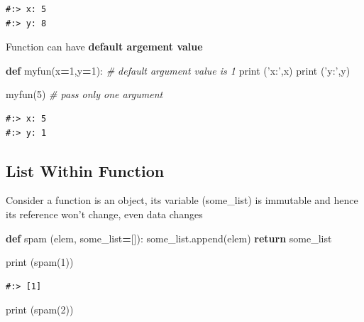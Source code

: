 \documentclass[
]{book}
\newenvironment{Shaded}{\begin{snugshade}}{\end{snugshade}}
\newcommand{\BuiltInTok}[1]{#1}
\newcommand{\CommentTok}[1]{\textcolor[rgb]{0.37,0.37,0.37}{\textit{#1}}}
\newcommand{\ControlFlowTok}[1]{\textcolor[rgb]{0.27,0.27,0.27}{\textbf{#1}}}
\newcommand{\DecValTok}[1]{\textcolor[rgb]{0.06,0.06,0.06}{#1}}
\newcommand{\KeywordTok}[1]{\textcolor[rgb]{0.27,0.27,0.27}{\textbf{#1}}}
\newcommand{\NormalTok}[1]{#1}
\newcommand{\OperatorTok}[1]{\textcolor[rgb]{0.43,0.43,0.43}{\textbf{#1}}}
\newcommand{\StringTok}[1]{\textcolor[rgb]{0.5,0.5,0.5}{#1}}
\begin{document}
\begin{verbatim}
#:> x: 5
#:> y: 8
\end{verbatim}

Function can have \textbf{default argement value}

\begin{Shaded}
\begin{Highlighting}[]
\KeywordTok{def}\NormalTok{ myfun(x}\OperatorTok{=}\DecValTok{1}\NormalTok{,y}\OperatorTok{=}\DecValTok{1}\NormalTok{):  }\CommentTok{# default argument value is 1}
    \BuiltInTok{print}\NormalTok{ (}\StringTok{'x:'}\NormalTok{,x)}
    \BuiltInTok{print}\NormalTok{ (}\StringTok{'y:'}\NormalTok{,y)}
    
\NormalTok{myfun(}\DecValTok{5}\NormalTok{)  }\CommentTok{# pass only one argument}
\end{Highlighting}
\end{Shaded}

\begin{verbatim}
#:> x: 5
#:> y: 1
\end{verbatim}

\hypertarget{list-within-function}{%
\subsection{List Within Function}\label{list-within-function}}

Consider a function is an object, its variable (some\_list) is immutable and hence its reference won't change, even data changes

\begin{Shaded}
\begin{Highlighting}[]
\KeywordTok{def}\NormalTok{ spam (elem, some_list}\OperatorTok{=}\NormalTok{[]):}
\NormalTok{    some_list.append(elem)}
    \ControlFlowTok{return}\NormalTok{ some_list}

\BuiltInTok{print}\NormalTok{ (spam(}\DecValTok{1}\NormalTok{))}
\end{Highlighting}
\end{Shaded}

\begin{verbatim}
#:> [1]
\end{verbatim}

\begin{Shaded}
\begin{Highlighting}[]
\BuiltInTok{print}\NormalTok{ (spam(}\DecValTok{2}\NormalTok{))}
\end{Highlighting}
\end{Shaded}
\end{document}
